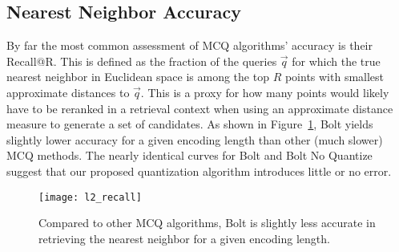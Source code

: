 




\vspace{-2mm}
\subsection{Nearest Neighbor Accuracy}

By far the most common assessment of MCQ algorithms' accuracy is their Recall@R. This is defined as the fraction of the queries $\vec{q}$ for which the true nearest neighbor in Euclidean space is among the top $R$ points with smallest approximate distances to $\vec{q}$. This is a proxy for how many points would likely have to be reranked in a retrieval context when using an approximate distance measure to generate a set of candidates. As shown in Figure~\ref{fig:nn_acc}, Bolt yields slightly lower accuracy for a given encoding length than other (much slower) MCQ methods. The nearly identical curves for Bolt and Bolt No Quantize suggest that our proposed quantization algorithm introduces little or no error. %

\begin{figure}[h]
\begin{center}
\texttt{[image: l2\_recall]}
\caption{Compared to other MCQ algorithms, Bolt is slightly less accurate in retrieving the nearest neighbor for a given encoding length.}
\label{fig:nn_acc}
\end{center}
\end{figure}

